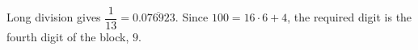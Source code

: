 Long division gives $\dfrac{1}{13}=0.\overline{076923}$. Since $100=16\cdot6+4$, the required digit is the fourth digit of the block, $\boxed9$.
